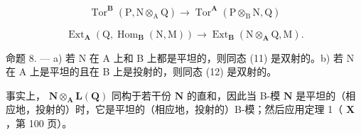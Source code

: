\[
\operatorname{Tor} ^ {\mathbf {B}} (\mathrm{P}, \mathrm{N} \otimes_ {\mathrm{A}} \mathrm{Q}) \rightarrow \operatorname{Tor} ^ {\mathbf {A}} (\mathrm{P} \otimes_ {\mathrm{B}} \mathrm{N}, \mathrm{Q})\tag{12}
\]

\[
\operatorname{Ext} _ {\mathbf {A}} \left(\mathrm{Q}, \operatorname{Hom} _ {\mathbf {B}} (\mathrm{N}, \mathrm{M})\right)\rightarrow \operatorname{Ext} _ {\mathbf {B}} \left(\mathrm{N} \otimes_ {\mathbf {A}} \mathrm{Q}, \mathrm{M}\right).
\]

命题 8. --- a) 若 N 在 A 上和 B 上都是平坦的，则同态 (11) 是双射的。b) 若 N 在 A 上是平坦的且在 B 上是投射的，则同态 (12) 是双射的。

事实上， \(\mathbf{N} \otimes_{\mathbf{A}} \mathbf{L}(\mathbf{Q})\) 同构于若干份 \(\mathbf{N}\) 的直和，因此当 B-模 \(\mathbf{N}\) 是平坦的（相应地，投射的）时，它是平坦的（相应地，投射的）B-模；然后应用定理 1（ \(\mathbf{X}\) ，第 100 页）。

